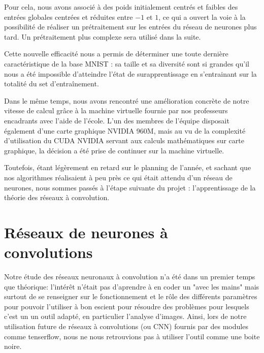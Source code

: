 \documentclass[
    10pt,
    a4paper,
    oneside,
    headinclude,footinclude,
    BCOR=5mm,
    captions=tableabove
]{scrartcl}
\begin{document}
Pour cela, nous avons associé à des poids initialement centrés et faibles des entrées globales centrées et réduites entre $-1$ et $1$, ce qui a ouvert la voie à la possibilité de réaliser un prétraitement sur les entrées du réseau de neurones plus tard. Un prétraitement plus complexe sera utilisé dans la suite. 

\vspace{5mm}
Cette nouvelle efficacité nous a permis de déterminer une toute dernière caractéristique de la base MNIST : sa taille et sa diversité sont si grandes qu'il nous a été impossible d'atteindre l'état de surapprentissage en s'entrainant sur la totalité du set d'entraînement.

Dans le même temps, nous avons rencontré une amélioration concrète de notre vitesse de calcul grâce à la machine virtuelle fournie par nos professeurs encadrants avec l'aide de l'école. L'un des membres de l'équipe disposait également d'une carte graphique NVIDIA 960M, mais au vu de la complexité d'utilisation du CUDA NVIDIA servant aux calculs mathématiques sur carte graphique, la décision a été prise de continuer sur la machine virtuelle.

Toutefois, étant légèrement en retard sur le planning de l'année, et sachant que nos algorithmes réalisaient à peu près ce qui était attendu d'un réseau de neurones, nous sommes passés à l'étape suivante du projet : l'apprentissage de la théorie des réseaux à convolution.
\vfill

\section{Réseaux de neurones à convolutions}


Notre étude des réseaux neuronaux à convolution n'a été dans un premier temps que théorique: l'intérêt n'était pas d'aprendre à en coder un "avec les mains" mais surtout de se renseigner sur le fonctionnement et le rôle des différents paramètres pour pouvoir l'utiliser à bon escient pour résoudre des problèmes pour lesquels c'est un un outil adapté, en particulier l'analyse d'images. Ainsi, lors de notre utilisation future de réseaux à convolutions (ou CNN) fournis par des modules comme tenserflow, nous ne nous retrouvions pas à utiliser l'outil comme une boite noire.
\vspace{5mm}
\end{document}
